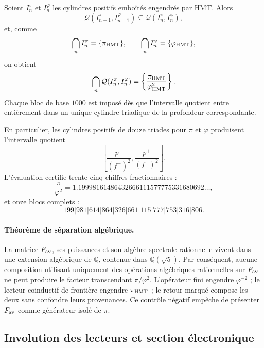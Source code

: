 Soient \(I_n^\pi\) et \(I_n^\varphi\) les cylindres positifs emboîtés
engendrés par HMT\@. Alors
\[
 \mathcal Q(I_{n+1}^\pi,I_{n+1}^\varphi)
 \subseteq
 \mathcal Q(I_n^\pi,I_n^\varphi),
\]
et, comme
\[
 \bigcap_n I_n^\pi=\{\pi_{\rm HMT}\},
 \qquad
 \bigcap_n I_n^\varphi=\{\varphi_{\rm HMT}\},
\]
on obtient
\[
 \bigcap_n\mathcal Q(I_n^\pi,I_n^\varphi)
 =\left\{\frac{\pi_{\rm HMT}}{\varphi_{\rm HMT}^2}\right\}.
\]
Chaque bloc de base \(1000\) est imposé dès que l'intervalle quotient
entre entièrement dans un unique cylindre triadique de la profondeur
correspondante.

En particulier, les cylindres positifs de douze triades pour \(\pi\) et
\(\varphi\) produisent l'intervalle quotient
\[
 \left[
 \frac{p^-}{(f^+)^2},
 \frac{p^+}{(f^-)^2}
 \right].
\]
L'évaluation certifie trente-cinq chiffres fractionnaires :
\[
 \frac{\pi}{\varphi^2}
 =1.19998161486432666111577775331680692\ldots,
\]
et onze blocs complets :
\[
 199|981|614|864|326|661|115|777|753|316|806.
\]

\paragraph{Théorème de séparation algébrique.}
La matrice \(F_{\rm av}\), ses puissances et son algèbre spectrale rationnelle
vivent dans une extension algébrique de \(\mathbb Q\), contenue dans
\(\mathbb Q(\sqrt5)\). Par conséquent, aucune composition utilisant uniquement
des opérations algébriques rationnelles sur \(F_{\rm av}\) ne peut produire le
facteur transcendant \(\pi/\varphi^2\). L'opérateur fini engendre
\(\varphi^{-2}\) ; le lecteur coinductif de frontière engendre
\(\pi_{\rm HMT}\) ; le retour marqué compose les deux sans confondre leurs
provenances. Ce contrôle négatif empêche de présenter \(F_{\rm av}\) comme
générateur isolé de \(\pi\).

\subsection{Involution des lecteurs et section électronique}
\label{p12-83-c16-s3:sec:espejo-pi-phi-electron}

